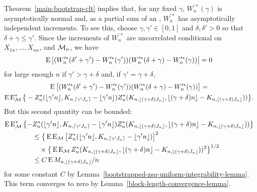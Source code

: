 \documentclass[11pt]{article}
\begin{document}
Theorem~\ref{main-bootstrap-clt} implies that, for any fixed $\gamma$,
$W_n^{\prime *}(\gamma)$ is asymptotically normal and, as a
partial sum of an \mds, $W_n^{\prime *}$ has asymptotically independent
increments. To see this, choose $\gamma, \gamma' \in [0,1]$ and
$\delta, \delta' > 0$ so that $\delta + \gamma \leq \gamma'$. Since
the increments of $W_n^{\prime *}$ are uncorrelated conditional on
$X_{1n},\dots,X_{nn}$, and $\mathcal{M}_n$, we have
\begin{equation*}
    \operatorname{E}\big| (W_n^{\prime *}(\delta' + \gamma') - W_n^{\prime *}(\gamma'))
  (W_n^{\prime *}(\delta + \gamma) - W_n^{\prime *}(\gamma)) \big| = 0
\end{equation*}
for large enough $n$ if $\gamma' > \gamma + \delta$ and, if $\gamma' =
\gamma + \delta$,
\begin{multline*}
  \operatorname{E}\big[(W_n^{\prime *}(\delta' + \gamma') - W_n^{\prime *}(\gamma'))
  (W_n^{\prime *}(\delta + \gamma) - W_n^{\prime *}(\gamma)) \big] = \\
  \operatorname{E} \operatorname{E}_{\mathcal{M}}^*\big\{- Z_n^*(\lfloor \gamma' n \rfloor, K_{n, \lceil \gamma' J_n \rceil }- \lfloor \gamma' n \rfloor)
  Z_n^*(K_{n,\lfloor (\gamma + \delta) J_n \rfloor},
  \lfloor (\gamma + \delta) n \rfloor - K_{n,\lfloor (\gamma + \delta) J_n \rfloor}))\big\}.
\end{multline*}
But this second quantity can be bounded:
\begin{align*}
  \operatorname{E} \operatorname{E}_{\mathcal{M}}^*\big\{-& Z_n^*(\lfloor \gamma' n \rfloor,
  K_{n, \lceil \gamma' J_n \rceil }- \lfloor \gamma' n \rfloor)
  Z_n^*(K_{n,\lfloor (\gamma + \delta) J_n \rfloor},
  \lfloor (\gamma + \delta) n \rfloor - K_{n,\lfloor (\gamma + \delta) J_n \rfloor}))\big\} \\
  &\leq \big\{\operatorname{E} \operatorname{E}_{\mathcal{M}}\big[Z_n^*(\lfloor \gamma' n \rfloor, K_{n, \lceil \gamma' J_n \rceil }- \lfloor \gamma' n \rfloor)\big]^2 \\
  & \quad \times \big\{\operatorname{E} \operatorname{E}_{\mathcal{M}} Z_n^*(K_{n,\lfloor (\gamma + \delta) J_n \rfloor},
  \lfloor (\gamma + \delta) n \rfloor - K_{n,\lfloor (\gamma + \delta) J_n \rfloor}))^2\big\}^{1/2} \\
  &\leq C \operatorname{E} M_{n, \lfloor (\gamma + \delta) J_n \rfloor} / n
\end{align*}
for some constant $C$ by
Lemma~\ref{bootstrapped-zsq-uniform-integrability-lemma}. This term
converges to zero by Lemma~\ref{block-length-convergence-lemma}.
\end{document}
